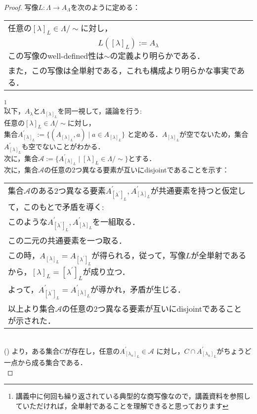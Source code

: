 \documentclass{jarticle}
\begin{document}
\begin{proof}
	写像$L: \Lambda \rightarrow A_\Lambda$を次のように定める：\\
	\begin{tabular}{|p{11cm}|}
		\hline
	任意の$[\lambda]_L \in \Lambda / \! \sim$に対し，\\
	$$
	L([\lambda]_L):=A_\lambda
	$$
	この写像のwell-defined性は$\sim$の定義より明らかである．\\
	また，この写像は全単射である，これも構成より明らかな事実である．\\
		\hline
	\end{tabular}
		\footnote{講義中に何回も繰り返されている典型的な商写像なので，講義資料を参照していただければ，全単射であることを理解できると思っております}\\
		

	以下，$A_\lambda$と$A_{[\lambda]_L}$を同一視して，議論を行う:\\
	任意の$[\lambda]_L \in \Lambda / \! \sim$に対し，\\
	集合$A_{[\lambda]_L}^{'} := \{ (A_{[\lambda ]_{L}}, a) \mid a \in A_{[\lambda ]_L } \}$
	と定める．$A_{[\lambda]_L}$が空でないため，集合$A_{[\lambda]_L}^{'}$も空でないことがわかる．\\
	次に，集合$\mathcal{A} := \{ A_{[\lambda]_L}^{'} \mid [\lambda]_L \in \Lambda / \! \sim \}$とする．\\
	次に，集合$\mathcal{A}$の任意の2つ異なる要素が互いにdisjointであることを示す：\\
	\begin{tabular}{|p{11cm}|}
		\hline
	集合$\mathcal{A}$のある2つ異なる要素$A_{[\lambda^{'}]_L}^{'} , A_{[\lambda]_L}^{'}$が共通要素を持つと仮定して，このもとで矛盾を導く:\\
	このような$A_{[\lambda^{'}]_L}^{'} , A_{[\lambda]_L}^{'}$を一組取る．\\
	この二元の共通要素を一つ取る．\\
	この時，$A_{[\lambda]_L} = A_{[\lambda^{'}]_L}$が得られる，従って，写像$L$が全単射であるから，$[\lambda]_L =[\lambda^{'}]_L$が成り立つ．\\
	よって，$A_{[\lambda^{'}]_L}^{'} = A_{[\lambda]_L}^{'}$が導かれ，矛盾が生じる．\\
	以上より集合$\mathcal{A}$の任意の2つ異なる要素が互いにdisjointであることが示された．\\
		\hline
	\end{tabular}
	\\
	() より，ある集合$C$が存在し，任意の$A_{[\lambda_\alpha]_{L}}^{'} \in \mathcal{A}$
	に対し，$ C \cap A_{[\lambda_\alpha]_{L}}^{'}$がちょうど一点から成る集合である．\\

\end{proof}
\end{document}
